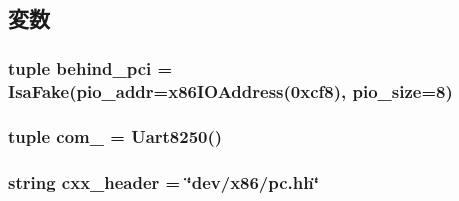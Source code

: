 \subsection{変数}
\hypertarget{classPc_1_1Pc_a6ac8b3a3805c08896b06e8e48e3dea5a}{
\subsubsection[{behind\_\-pci}]{\setlength{\rightskip}{0pt plus 5cm}tuple {\bf behind\_\-pci} = {\bf IsaFake}(pio\_\-addr=x86IOAddress(0xcf8), pio\_\-size=8)}}
\label{classPc_1_1Pc_a6ac8b3a3805c08896b06e8e48e3dea5a}
\hypertarget{classPc_1_1Pc_a5dd9bce9d6b4a3436f223b46176c59bb}{
\subsubsection[{com\_\-1}]{\setlength{\rightskip}{0pt plus 5cm}tuple {\bf com\_} = {\bf Uart8250}()}}
\label{classPc_1_1Pc_a5dd9bce9d6b4a3436f223b46176c59bb}
\hypertarget{classPc_1_1Pc_a17da7064bc5c518791f0c891eff05fda}{
\subsubsection[{cxx\_\-header}]{\setlength{\rightskip}{0pt plus 5cm}string {\bf cxx\_\-header} = \char`\"{}dev/x86/pc.hh\char`\"{}}}
\label{classPc_1_1Pc_a17da7064bc5c518791f0c891eff05fda}



